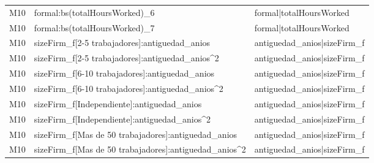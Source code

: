 \begin{longtable}{lll}
M10 & formal:bs(totalHoursWorked)\_6 & formal|totalHoursWorked \\
M10 & formal:bs(totalHoursWorked)\_7 & formal|totalHoursWorked \\
M10 & sizeFirm\_f[2-5 trabajadores]:antiguedad\_anios & antiguedad\_anios|sizeFirm\_f \\
M10 & sizeFirm\_f[2-5 trabajadores]:antiguedad\_anios\textasciicircum 2 & antiguedad\_anios|sizeFirm\_f \\
M10 & sizeFirm\_f[6-10 trabajadores]:antiguedad\_anios & antiguedad\_anios|sizeFirm\_f \\
M10 & sizeFirm\_f[6-10 trabajadores]:antiguedad\_anios\textasciicircum 2 & antiguedad\_anios|sizeFirm\_f \\
M10 & sizeFirm\_f[Independiente]:antiguedad\_anios & antiguedad\_anios|sizeFirm\_f \\
M10 & sizeFirm\_f[Independiente]:antiguedad\_anios\textasciicircum 2 & antiguedad\_anios|sizeFirm\_f \\
M10 & sizeFirm\_f[Mas de 50 trabajadores]:antiguedad\_anios & antiguedad\_anios|sizeFirm\_f \\
M10 & sizeFirm\_f[Mas de 50 trabajadores]:antiguedad\_anios\textasciicircum 2 & antiguedad\_anios|sizeFirm\_f \\
\end{longtable}
